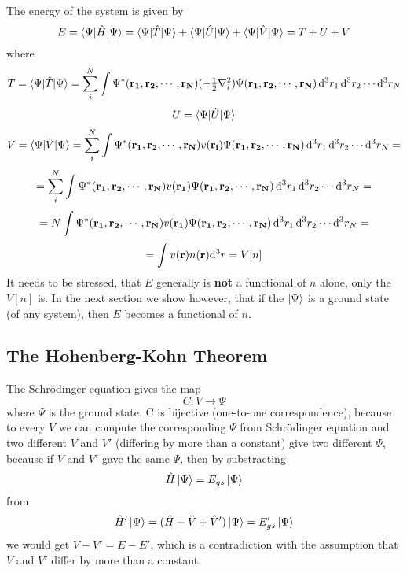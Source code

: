 The energy of the system is given by 
\begin{equation}
  E=\mathinner{\langle{\Psi|\hat H|\Psi}\rangle}= \mathinner{\langle{\Psi|\hat T|\Psi}\rangle}+\mathinner{\langle{\Psi|\hat U|\Psi}\rangle}+\mathinner{\langle{\Psi|\hat V|\Psi}\rangle}= T+U+V  \label{Emanybody}
\end{equation}
where 
\begin{equation*}
  T=\mathinner{\langle{\Psi|\hat T|\Psi}\rangle}=\sum_i^N\int \Psi^*({\bf r_1},{\bf r_2},\cdots,{\bf r_N})(-{\textstyle{1\over2}}\nabla_i^2) \Psi({\bf r_1},{\bf r_2},\cdots,{\bf r_N})\,{\rm d}^3 r_1\,{\rm d}^3 r_2\cdots{\rm d}^3 r_N
\end{equation*}
\begin{equation*}
  U=\mathinner{\langle{\Psi|\hat U|\Psi}\rangle}
\end{equation*}
\begin{equation*}
  V=\mathinner{\langle{\Psi|\hat V|\Psi}\rangle}=\sum_i^N\int \Psi^*({\bf r_1},{\bf r_2},\cdots,{\bf r_N})v({\bf r_i}) \Psi({\bf r_1},{\bf r_2},\cdots,{\bf r_N})\,{\rm d}^3 r_1\,{\rm d}^3 r_2\cdots{\rm d}^3 r_N=
\end{equation*}
\begin{equation*}
  =\sum_i^N\int \Psi^*({\bf r_1},{\bf r_2},\cdots,{\bf r_N})v({\bf r_1}) \Psi({\bf r_1},{\bf r_2},\cdots,{\bf r_N})\,{\rm d}^3 r_1\,{\rm d}^3 r_2\cdots{\rm d}^3 r_N=
\end{equation*}
\begin{equation*}
  =N\int \Psi^*({\bf r_1},{\bf r_2},\cdots,{\bf r_N})v({\bf r_1}) \Psi({\bf r_1},{\bf r_2},\cdots,{\bf r_N})\,{\rm d}^3 r_1\,{\rm d}^3 r_2\cdots{\rm d}^3 r_N=
\end{equation*}
\begin{equation}
  =\int v({\bf r}) n({\bf r}){\rm d}^3 r=V[n]  \label{V[n]}
\end{equation}
It needs to be stressed, that $E$ generally is \textbf{not} a functional of $n$ alone, only the $V[n]$ is. In the next section we show however, that if the $\mathinner{|{\Psi}\rangle}$ is a ground state (of any system), then $E$ becomes a functional of $n$.

\subsection{The Hohenberg-Kohn Theorem}

The Schrödinger equation gives the map
\begin{equation*}
  C: V \to \Psi
\end{equation*}
where $\Psi$ is the ground state. C is bijective (one-to-one correspondence),
because to every $V$ we can compute the corresponding $\Psi$ from Schrödinger
equation and two
different $V$ and $V'$ (differing by more than a constant) give two different
$\Psi$, because if $V$ and $V'$ gave the same $\Psi$, then by substracting 
\begin{equation*}
  \hat H\mathinner{|{\Psi}\rangle}=E_{gs}\mathinner{|{\Psi}\rangle}
\end{equation*}
from 
\begin{equation*}
  \hat H'\mathinner{|{\Psi}\rangle}=(\hat H-\hat V+\hat V')\mathinner{|{\Psi}\rangle}=E_{gs}'\mathinner{|{\Psi}\rangle}
\end{equation*}
we would get $V-V'=E-E'$, which is a contradiction with the assumption that $V$ and $V'$ differ by more than a constant.

